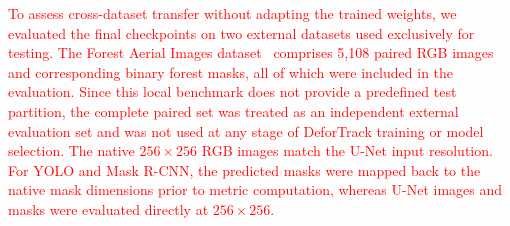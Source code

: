 \documentclass[journal,article,submit,pdftex,moreauthors]{Definitions/mdpi}
\begin{document}
\textcolor{red}{To assess cross-dataset transfer without adapting the trained weights, we evaluated the final checkpoints on two external datasets used exclusively for testing. The Forest Aerial Images dataset~\cite{quadeer2024augmentedforest} comprises 5,108 paired RGB images and corresponding binary forest masks, all of which were included in the evaluation. Since this local benchmark does not provide a predefined test partition, the complete paired set was treated as an independent external evaluation set and was not used at any stage of DeforTrack training or model selection. The native $256\times256$ RGB images match the U-Net input resolution. For YOLO and Mask R-CNN, the predicted masks were mapped back to the native mask dimensions prior to metric computation, whereas U-Net images and masks were evaluated directly at $256\times256$.}

\begin{table}[!t]
\color{red}
\centering
\caption{Top three models by IoU on each external forest/non-forest segmentation dataset.}
\label{t6}
\scriptsize
{}
\end{table}
\end{document}
